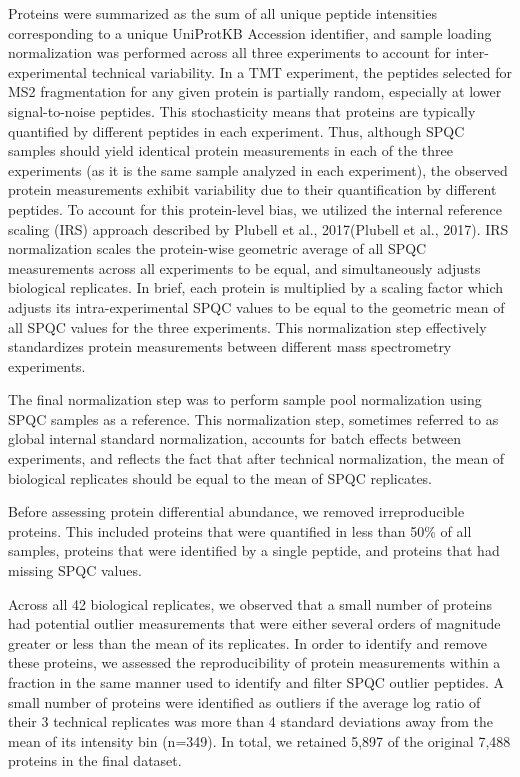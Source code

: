 Proteins were summarized as the sum of all unique peptide intensities
corresponding to a unique UniProtKB Accession identifier, and sample loading
normalization was performed across all three experiments to account for
inter-experimental technical variability. In a TMT experiment, the peptides
selected for MS2 fragmentation for any given protein is partially random,
especially at lower signal-to-noise peptides. This stochasticity means that
proteins are typically quantified by different peptides in each experiment.
Thus, although SPQC samples should yield identical protein measurements in each
of the three experiments (as it is the same sample analyzed in each experiment),
the observed protein measurements exhibit variability due to their
quantification by different peptides. To account for this protein-level bias, we
utilized the internal reference scaling (IRS) approach described by Plubell et
al., 2017(Plubell et al., 2017). IRS normalization scales the protein-wise
geometric average of all SPQC measurements across all experiments to be equal,
and simultaneously adjusts biological replicates. In brief, each protein is
multiplied by a scaling factor which adjusts its intra-experimental SPQC values
to be equal to the geometric mean of all SPQC values for the three experiments.
This normalization step effectively standardizes protein measurements between
different mass spectrometry experiments.

The final normalization step was to perform sample pool normalization using SPQC
samples as a reference. This normalization step, sometimes referred to as global
internal standard normalization, accounts for batch effects between experiments,
and reflects the fact that after technical normalization, the mean of biological
replicates should be equal to the mean of SPQC replicates.

Before assessing protein differential abundance, we removed irreproducible
proteins. This included proteins that were quantified in less than 50\% of all
samples, proteins that were identified by a single peptide, and proteins that
had missing SPQC values.

Across all 42 biological replicates, we observed that
a small number of proteins had potential outlier measurements that were either
several orders of magnitude greater or less than the mean of its replicates. In
order to identify and remove these proteins, we assessed the reproducibility of
protein measurements within a fraction in the same manner used to identify and
filter SPQC outlier peptides. A small number of proteins were identified as
outliers if the average log ratio of their 3 technical replicates was more than
4 standard deviations away from the mean of its intensity bin (n=349). In total,
we retained 5,897 of the original 7,488 proteins in the final dataset.

